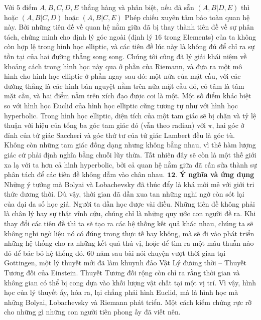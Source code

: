 \documentclass{article}
\begin{document}
	\vskip 0.1cm
	Với $5$ điểm $A, B, C, D, E$ thẳng hàng và phân biệt, nếu đã sẵn $(A, B | D, E)$ thì hoặc $(A, B | C, D)$ hoặc $(A, B | C, E)$
	Phép chiếu xuyên tâm bảo toàn quan hệ này.
	\vskip 0.1cm
	Bởi những tiên đề về quan hệ nằm giữa đã bị thay thành tiên đề về sự phân tách, chứng minh cho định lý góc ngoài (định lý $16$ trong Elements) của ta không còn hợp lệ trong hình học elliptic, và các  tiên đề lúc này là không đủ để chỉ ra sự tồn tại của hai đường thẳng song song. 
	\vskip 0.1cm
	Chúng tôi cũng đã lý giải khái niệm về khoảng cách trong hình học này qua ở phần của Riemann, và đưa ra một mô hình cho hình học elliptic ở phần ngay sau đó: một nửa của mặt cầu, với các đường thẳng là các hình bán nguyệt nằm trên nửa mặt cầu đó, có tâm là tâm mặt cầu, và hai điểm nằm trên xích đạo được coi là một. 
	\vskip 0.1cm
	Một số điểm khác biệt so với hình học Euclid của hình học elliptic cũng tương tự như với hình học hyperbolic. Trong hình học elliptic, diện tích của một tam giác sẽ bị chặn và tỷ lệ thuận với hiệu của tổng ba góc tam giác đó (vẫn theo radian) với $\pi$, hai góc ở đỉnh của tứ giác Saccheri và góc thứ tư của tứ giác Lambert đều là góc tù. Không còn những tam giác đồng dạng nhưng không bằng nhau, vì thế hàm lượng giác cứ phải định nghĩa bằng chuỗi lũy thừa. Tất nhiên đây sẽ còn là một thế giới xa lạ với ta hơn cả hình hyperbolic, bởi cả quan hệ nằm giữa đã cần sửa thành sự phân tách để các tiên đề không dẫm vào chân nhau. 
	\vskip 0.1cm
	$\pmb{12.}$ \textbf{\color{lichsutoanhoc}Ý nghĩa và ứng dụng}
	\vskip 0.1cm
	Những ý tưởng mà Bolyai và Lobachevsky đã thúc đẩy là khá mới mẻ với giới tri thức đương thời. Dù vậy, thời gian đã dần xua tan những nghi ngờ còn sót lại của đại đa số học giả. Người ta dần học được vài điều. Những tiên đề không phải là chân lý hay sự thật vĩnh cửu, chúng chỉ là những quy ước con người đề ra. Khi thay đổi các tiên đề thì ta sẽ tạo ra các hệ thống kết quả khác nhau, chúng ta sẽ không nghi ngờ liệu nó có đúng trong thực tế hay không, mà sẽ đi vào phát triển những hệ thống cho ra những kết quả thú vị, hoặc để tìm ra một mâu thuẫn nào đó để bác bỏ hệ thống đó.
	\vskip 0.1cm
	$60$ năm sau bài nói chuyện vượt thời gian tại Gottingen, một lý thuyết mới đã làm khuynh đảo Vật Lý đương thời -- Thuyết Tương đối của Einstein. Thuyết Tương đối rộng còn chỉ ra rằng thời gian và không gian có thể bị cong dựa vào khối lượng vật chất tại một vị trí. Vì vậy, hình học của lý thuyết ấy, hóa ra, lại chẳng phải hình Euclid, mà là hình học mà những Bolyai, Lobachevsky và Riemann phát triển. Một cách kiểm chứng rực rỡ cho những gì những con người tiên phong ấy đã viết nên.
\end{document}
